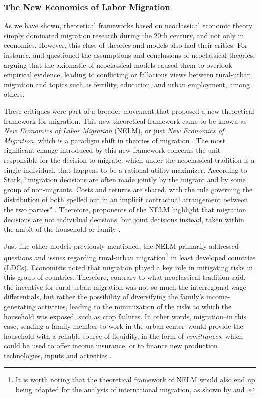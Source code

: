 \subsubsection{The New Economics of Labor Migration} \label{lit_review_theories_NELM}

As we have shown, theoretical frameworks based on neoclassical economic theory simply dominated migration research during the 20th century, and not only in economics. However, this class of theories and models also had their critics. For instance, \cite{stark_new_1985} and \cite{stark_migration_1991} questioned the assumptions and conclusions of neoclassical theories, arguing that the axiomatic of neoclassical models caused them to overlook empirical evidence, leading to conflicting or fallacious views between rural-urban migration and topics such as fertility, education, and urban employment, among others.

These critiques were part of a broader movement that proposed a new theoretical framework for migration. This new theoretical framework came to be known as \textit{New Economics of Labor Migration} (NELM), or just \textit{New Economics of Migration}, which is a paradigm shift in theories of migration \citep{stark_new_1985, stark_migration_1991}. The most significant change introduced by this new framework concerns the unit responsible for the decision to migrate, which under the neoclassical tradition is a single individual, that happens to be a rational utility-maximizer. According to Stark, ``migration decisions are often made jointly by the migrant and by some group of non-migrants. Costs and returns are shared, with the rule governing the distribution of both spelled out in an implicit contractual arrangement between the two parties" \citep[p. 25]{stark_migration_1991}. Therefore, proponents of the NELM highlight that migration decisions are not individual decisions, but joint decisions instead, taken within the ambit of the household or family \citep{stark_new_1985, stark_migration_1988, stark_migration_1991}. 

Just like other models previously mentioned, the NELM primarily addressed questions and issues regarding rural-urban migration\footnote{It is worth noting that the theoretical framework of NELM would also end up being adapted for the analysis of international migration, as shown by \cite{massey_theories_1993} and \cite{king_theories_2012}.} in least developed countries (LDCs). Economists noted that migration played a key role in mitigating risks in this group of countries. Therefore, contrary to what neoclassical tradition said, the incentive for rural-urban migration was not so much the interregional wage differentials, but rather the possibility of diversifying the family's income-generating activities, leading to the minimization of the risks to which the household was exposed, such as crop failures. In other words, migration--in this case, sending a family member to work in the urban center--would provide the household with a reliable source of liquidity, in the form of \textit{remittances}, which could be used to offer income insurance, or to finance new production technologies, inputs and activities \citep{stark_migration_1982, stark_new_1985, stark_migration_1988, stark_migration_1991, taylor_new_1999}.

